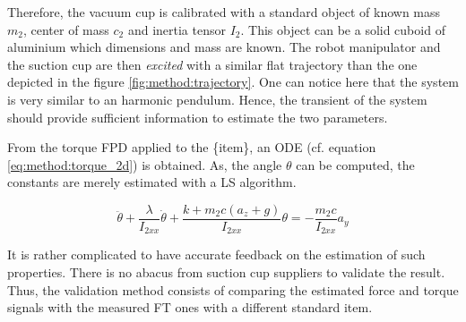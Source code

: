 \documentclass[/home/francois/latex/report/main.tex]{subfiles}
\begin{document}
Therefore, the vacuum cup is calibrated with a standard object of known mass $m_2$, center of mass $c_2$ and inertia tensor $I_2$. This object can be a solid cuboid of aluminium which dimensions and mass are known. The robot manipulator and the suction cup are then \textit{excited} with a similar flat trajectory than the one depicted in the figure \ref{fig:method:trajectory}. One can notice here that the system is very similar to an harmonic pendulum. Hence, the transient of the system should provide sufficient information to estimate the two parameters.

From the torque \ac{FPD} applied to the \{item\}, an \ac{ODE} (cf. equation \ref{eq:method:torque_2d}) is obtained. As, the angle $\theta$ can be computed, the constants are merely estimated with a \ac{LS} algorithm.

\begin{equation}
  \label{eq:method:torque_2d}
 \ddot{\theta} + \frac{\lambda}{I_{2xx}} \dot{\theta} + \frac{k + m_2 c (a_z + g)}{I_{2xx}} \theta = - \frac{m_2 c}{I_{2xx}} a_y
\end{equation}

It is rather complicated to have accurate feedback on the estimation of such properties. There is no abacus from suction cup suppliers to validate the result. Thus, the validation method consists of comparing the estimated force and torque signals with the measured \ac{FT} ones with a different standard item.
\end{document}

